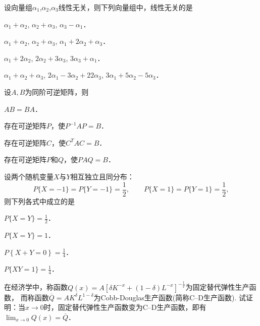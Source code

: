 \documentclass[plain,noanswer,medmath]{../../template/jnuexam}
\begin{document}
\begin{problem}
设向量组$\alpha_1$,$\alpha_2$,$\alpha_3$线性无关，则下列向量组中，线性无关的是\pickout{}
\begin{abcd}
\item $\alpha_1 + \alpha_2$, $\alpha_2 + \alpha_3$, $\alpha_3 - \alpha_1$．
\item $\alpha_1 + \alpha_2$, $\alpha_2 + \alpha_3$, $\alpha_1 + 2\alpha_2 + \alpha_3$．
\item $\alpha_1 + 2\alpha_2$, $2\alpha_2 + 3\alpha_3$, $3\alpha_3 + \alpha_1$．
\item $\alpha_1 + \alpha_2 + \alpha_3$, $2\alpha_1 - 3\alpha_2 + 22\alpha_3$,
      $3\alpha_1 + 5\alpha_2 - 5\alpha_3$．
\end{abcd}
\end{problem}


\begin{problem}
设$A,B$为同阶可逆矩阵，则\pickout{}
\begin{abcd}
\item $AB = BA$．
\item 存在可逆矩阵$P$，使$P^{-1} AP = B$．
\item 存在可逆矩阵$C$，使$C^T AC = B$．
\item 存在可逆矩阵$P$和$Q$，使$PAQ = B$．
\end{abcd}
\end{problem}


\begin{problem}
设两个随机变量$X$与$Y$相互独立且同分布：
$$P\{X = - 1\} = P\{Y = - 1\} = \frac{1}{2},\qquad P\{X = 1\} = P\{Y = 1\} = \frac{1}{2},$$
则下列各式中成立的是\pickout{}
\begin{abcd}
\item $P\{X = Y\} = \frac{1}{2}$．
\item $P\{X = Y\} = 1$．
\item $P\left\{X + Y = 0 \right\} = \frac{1}{4}$．
\item $P\{XY = 1\} = \frac{1}{4}$．
\end{abcd}
\end{problem}



\begin{problem}
在经济学中，称函数$Q(x) = A[\delta K^{- x} + (1 - \delta)L^{- x}]^{- \frac{1}{x}}$为固定替代弹性生产函数，
而称函数$\overline{Q}= AK^{\delta}L^{1 - \delta}$为Cobb-Douglas生产函数(简称C--D生产函数).
试证明：当$x \to 0$时，固定替代弹性生产函数变为C--D生产函数，即有$\lim_{x \to 0} Q(x) = \overline{Q}$．
\end{problem}
\end{document}
